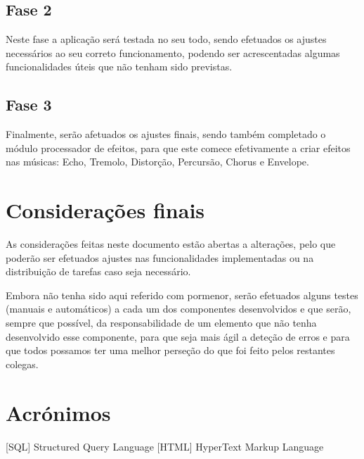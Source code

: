 \documentclass{report}
\begin{document}
\section{Fase 2}
Neste fase a aplicação será testada no seu todo, sendo efetuados os ajustes necessários ao seu correto funcionamento, podendo ser acrescentadas algumas funcionalidades úteis que não tenham sido previstas.
\section{Fase 3}
Finalmente, serão afetuados os ajustes finais, sendo também completado o módulo processador de efeitos, para que este comece efetivamente a criar efeitos nas músicas: Echo, Tremolo, Distorção, Percursão, Chorus e Envelope.

\chapter{Considerações finais}
\label{chap.finais}

As considerações feitas neste documento estão abertas a alterações, pelo que poderão ser efetuados ajustes nas funcionalidades implementadas ou na distribuição de tarefas caso seja necessário.

Embora não tenha sido aqui referido com pormenor, serão efetuados alguns testes (manuais e automáticos) a cada um dos componentes desenvolvidos e que serão, sempre que possível, da responsabilidade de um elemento que não tenha desenvolvido esse componente, para que seja mais ágil a deteção de erros e para que todos possamos ter uma melhor perseção do que foi feito pelos restantes colegas.


\chapter*{Acrónimos}
\begin{acronym}
[SQL] {Structured Query Language}
 [HTML] {HyperText Markup Language}

\end{acronym}


\printbibliography
\end{document}
